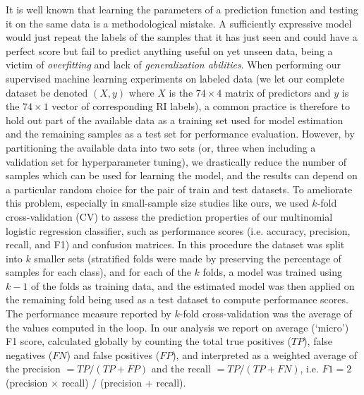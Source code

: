 \documentclass[10pt,letterpaper]{article}
\begin{document}
It is well known that learning the parameters of a prediction function and testing it on the same data is a methodological mistake. A sufficiently expressive model would just repeat the labels of the samples that it has just seen and could have a perfect score but fail to predict anything useful on yet unseen data, being a victim of {\it overfitting} and lack of {\it generalization abilities}.  
When performing our supervised machine learning experiments on labeled data (we let our complete dataset be denoted $(X,y)$ where $X$ is the 
$74 \times 4$ matrix of predictors and $y$ is the $74 \times 1$ vector of corresponding RI labels), a common practice is therefore to hold out part of the available data as a training set used for model estimation and the remaining samples as a test set for performance evaluation. 
However, by partitioning the available data into two sets (or, three when including a validation set for hyperparameter tuning), we drastically reduce the number of samples which can be used for learning the model, and the results can depend on a particular random choice for the pair of train and test datasets.
To ameliorate this problem, especially in small-sample size studies like ours, we used $k$-fold cross-validation (CV) to assess the prediction properties of our multinomial logistic regression classifier, such as performance scores (i.e. accuracy, precision, recall, and F1) and confusion matrices. 
In this procedure the dataset was split into $k$ smaller sets (stratified folds were made by preserving the percentage of samples for each class), and for each of the $k$ folds, a model was trained using $k-1$ of the folds as training data, and the estimated model was then applied on the remaining fold being used as a test dataset to compute performance scores.
The performance measure reported by $k$-fold cross-validation was the average of the values computed in the loop. In our analysis we report on average (`micro') F1 score, calculated globally by counting the total true positives ($TP$), false negatives ($FN$) and false positives ($FP$),  
and interpreted as a weighted average of the precision $= TP/(TP+FP)$ and the recall $= TP/(TP+FN)$, 
i.e. $F1 = 2$ (precision $\times$ recall) / (precision + recall).
\end{document}
